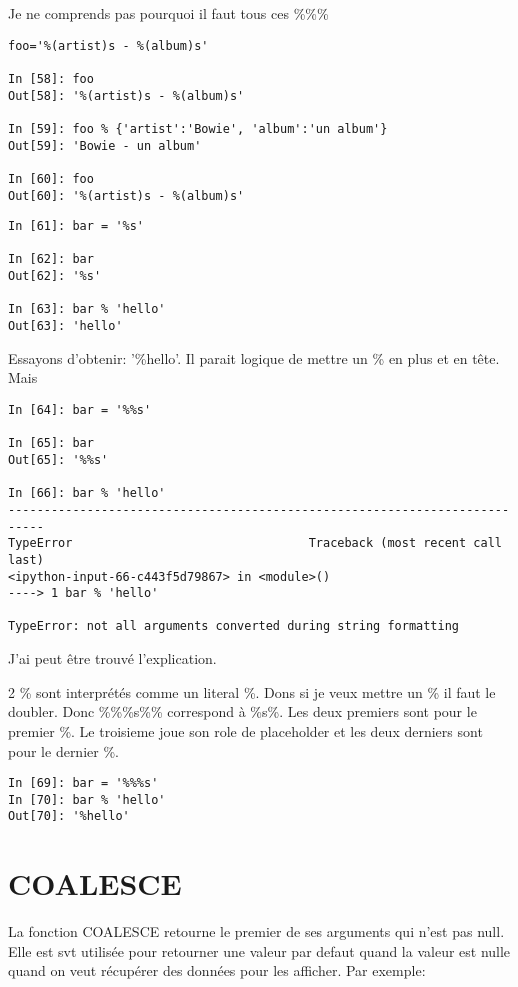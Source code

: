 \documentclass[12pt,a4paper]{article}
\begin{document}
Je ne comprends pas pourquoi il faut tous ces \%\%\%


\begin{verbatim}
foo='%(artist)s - %(album)s'

In [58]: foo
Out[58]: '%(artist)s - %(album)s'

In [59]: foo % {'artist':'Bowie', 'album':'un album'}
Out[59]: 'Bowie - un album'

In [60]: foo
Out[60]: '%(artist)s - %(album)s'
\end{verbatim}

\begin{verbatim}
In [61]: bar = '%s'

In [62]: bar
Out[62]: '%s'

In [63]: bar % 'hello'
Out[63]: 'hello'
\end{verbatim}


Essayons d'obtenir: '\%hello'. Il parait logique de mettre un \%  en plus et en tête. Mais
\begin{verbatim}
In [64]: bar = '%%s'

In [65]: bar
Out[65]: '%%s'

In [66]: bar % 'hello'
---------------------------------------------------------------------------
TypeError                                 Traceback (most recent call last)
<ipython-input-66-c443f5d79867> in <module>()
----> 1 bar % 'hello'

TypeError: not all arguments converted during string formatting
\end{verbatim}

J'ai peut être trouvé l'explication.

2 \% sont interprétés comme un literal \%. Dons si je veux mettre un \% il faut le doubler. Donc \%\%\%s\%\% correspond à \%s\%. Les deux premiers sont pour le premier \%. Le troisieme joue son role de placeholder et les deux derniers sont pour le dernier \%.  

\begin{verbatim}
In [69]: bar = '%%%s'
In [70]: bar % 'hello'
Out[70]: '%hello'
\end{verbatim}

\section{COALESCE}
\label{sec:coalesce}

La fonction COALESCE retourne le premier de ses arguments qui n'est pas null. 
Elle est svt utilisée pour retourner une valeur par defaut quand la valeur est nulle quand on veut récupérer des données pour les afficher. Par exemple:
\end{document}
